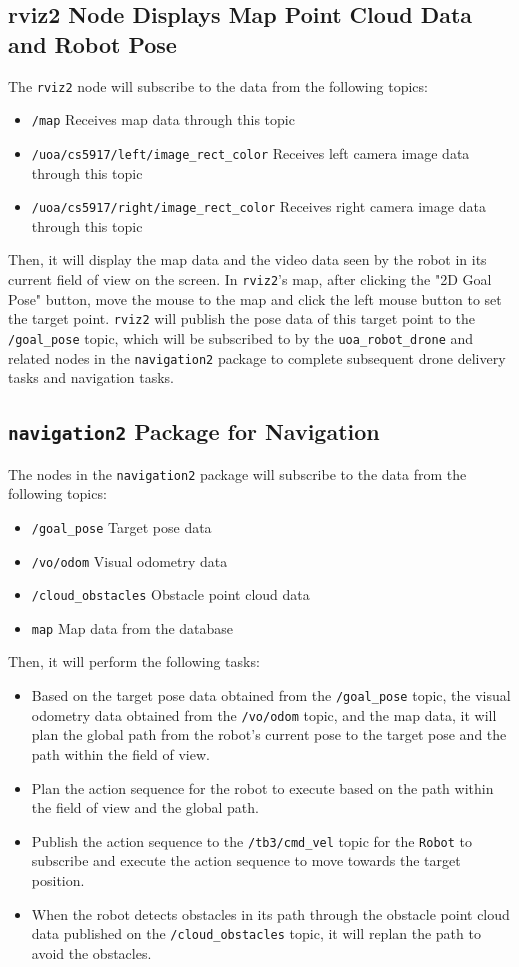 \subsection{rviz2 Node Displays Map Point Cloud Data and Robot Pose}
The \texttt{rviz2} node will subscribe to the data from the following topics:
\begin{itemize}
     \item \texttt{/map}
        Receives map data through this topic
     \item \texttt{/uoa/cs5917/left/image\_rect\_color}
         Receives left camera image data through this topic
     \item \texttt{/uoa/cs5917/right/image\_rect\_color}
         Receives right camera image data through this topic
\end{itemize}
Then, it will display the map data and the video data seen by the robot in its current field of view on the screen. In \texttt{rviz2}'s map, after clicking the "2D Goal Pose" button, move the mouse to the map and click the left mouse button to set the target point. \texttt{rviz2} will publish the pose data of this target point to the \texttt{/goal\_pose} topic, which will be subscribed to by the \texttt{uoa\_robot\_drone} and related nodes in the \texttt{navigation2} package to complete subsequent drone delivery tasks and navigation tasks.
\subsection{\texttt{navigation2} Package for Navigation}
The nodes in the \texttt{navigation2} package will subscribe to the data from the following topics:
\begin{itemize}
     \item \texttt{/goal\_pose}
         Target pose data
     \item \texttt{/vo/odom}
         Visual odometry data
     \item \texttt{/cloud\_obstacles}
         Obstacle point cloud data
  \item \texttt{map}
         Map data from the database
\end{itemize}
Then, it will perform the following tasks:
\begin{itemize}
    \item Based on the target pose data obtained from the \texttt{/goal\_pose} topic, the visual odometry data obtained from the \texttt{/vo/odom} topic, and the map data, it will plan the global path from the robot's current pose to the target pose and the path within the field of view.
    \item Plan the action sequence for the robot to execute based on the path within the field of view and the global path.
        \item Publish the action sequence to the \texttt{/tb3/cmd\_vel} topic for the \texttt{Robot} to subscribe and execute the action sequence to move towards the target position.
        \item When the robot detects obstacles in its path through the obstacle point cloud data published on the \texttt{/cloud\_obstacles} topic, it will replan the path to avoid the obstacles.
\end{itemize}

